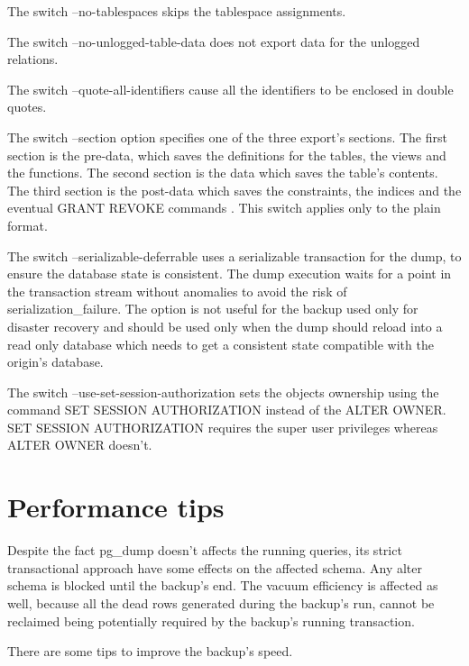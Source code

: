 The switch --no-tablespaces skips the tablespace assignments.\newline

The switch  --no-unlogged-table-data does not export data for the unlogged relations.\newline

The switch  --quote-all-identifiers  cause all the identifiers to be enclosed in double quotes. \newline

The switch --section option specifies one of the three export's sections. The first section is the 
pre-data, which saves the definitions for the tables, the views and the functions. The second section is the 
data which saves the table's contents. The third section is the post-data which saves the constraints, the 
indices and the eventual GRANT REVOKE commands . This switch applies only to the plain format. \newline

The switch --serializable-deferrable uses a serializable transaction for the dump, to ensure the database 
state is consistent. The dump execution waits for a point in the transaction stream without 
anomalies to avoid the risk of serialization\_failure. The option is not useful for the backup used 
only for disaster recovery and should be used only when the dump should reload into a read only database 
which needs to get a consistent state compatible with the origin's database.\newline

The switch --use-set-session-authorization sets the objects ownership using the command SET SESSION 
AUTHORIZATION instead of the ALTER OWNER. SET SESSION AUTHORIZATION requires the super user privileges 
whereas ALTER OWNER doesn't.


\section{Performance tips}
Despite the fact pg\_dump doesn't affects the running queries, its strict transactional approach 
have some effects on the affected schema. Any alter schema is blocked until the backup's end. The 
vacuum efficiency is affected as well, because all the dead rows generated during the backup's run, 
cannot be reclaimed being potentially required by the backup's running transaction.\newline

There are some tips to improve the backup's speed.

